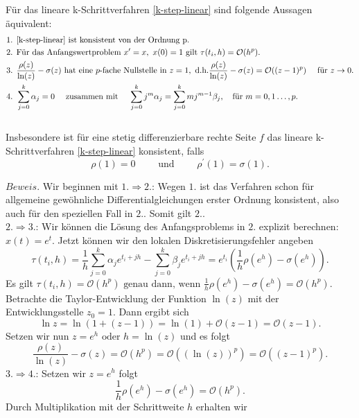 \begin{satz}
    Für das lineare k-Schrittverfahren \eqref{k-step-linear} sind folgende Aussagen äquivalent:
    \begin{align*}
        &\text{1. } \eqref{k-step-linear} \text{ ist konsistent von der Ordnung p.}\\
        &\text{2. Für das Anfangswertproblem }
            x^{\prime} = x, \text{ }
            x(0) = 1
        \text{ gilt } \tau(t_i,h) = \mathcal{O}(h^p).\\
        &\text{3. } \frac{\rho(z)}{\ln(z)} - \sigma(z) \text{ hat eine $p$-fache Nullstelle in } z= 1, \text{ d.h.}
            \frac{\rho(z)}{\ln(z)} - \sigma(z) = \mathcal{O}((z-1)^p) \quad \text{ für } z \rightarrow 0.\\
        &\text{4. } \sum_{j=0}^{k} \alpha_j = 0 \quad \text{ zusammen mit } \quad
        \sum_{j=0}^{k} j^m \alpha_j = \sum_{j=0}^{k} mj^{m-1} \beta_j,  \quad \text{für } m=0,1 \dots, p.
    \end{align*}\\
    Insbesondere ist für eine stetig differenzierbare rechte Seite $f$ das lineare k-Schrittverfahren
    \eqref{k-step-linear} konsistent, falls
    \[
        \rho(1) = 0 \qquad \text{ und } \qquad \rho^{\prime}(1)=\sigma(1).
    \]
\end{satz}
$Beweis.$ Wir beginnen mit $1. \Rightarrow 2.$: Wegen $1.$ ist das Verfahren schon für allgemeine gewöhnliche
Differentialgleichungen erster Ordnung konsistent, also auch für den speziellen Fall in $2.$. Somit gilt $2.$.\\
$2. \Rightarrow 3.$: Wir können die Lösung des Anfangsproblems in $2.$ explizit berechnen: $x(t)=e^{t}$. Jetzt können
wir den lokalen Diskretisierungsfehler angeben
\[
    \tau(t_i,h)= \frac{1}{h} \sum_{j=0}^{k} \alpha_j e^{t_i+jh} - \sum_{j=0}^{k} \beta_j e^{t_i+jh}
    = e^{t_i} \left( \frac{1}{h} \rho(e^h) - \sigma(e^{h}) \right).
\]
Es gilt $\tau(t_i,h)= \mathcal{O}(h^p) \text{ genau dann, wenn } \frac{1}{h} \rho(e^h) - \sigma(e^h) = \mathcal{O}(h^p)$.
Betrachte die Taylor-Entwicklung der Funktion $\ln(z)$ mit der Entwicklungsstelle $z_0 = 1$. Dann ergibt sich
\[
    \ln z = \ln (1 + (z-1)) = \ln(1) + \mathcal{O}(z-1) = \mathcal{O}(z-1).
\]
Setzen wir nun $z=e^h \text{ oder } h=\ln(z)$ und es folgt
\[
    \frac{\rho(z)}{\ln(z)} - \sigma(z) = \mathcal{O}(h^p) = \mathcal{O}((\ln(z))^p) = \mathcal{O}((z-1)^p).
\]
$3. \Rightarrow 4.$: Setzen wir $z=e^h$ folgt
\[
    \frac{1}{h} \rho(e^h) - \sigma(e^h) = \mathcal{O}(h^p).
\]
Durch Multiplikation mit der Schrittweite $h$ erhalten wir
